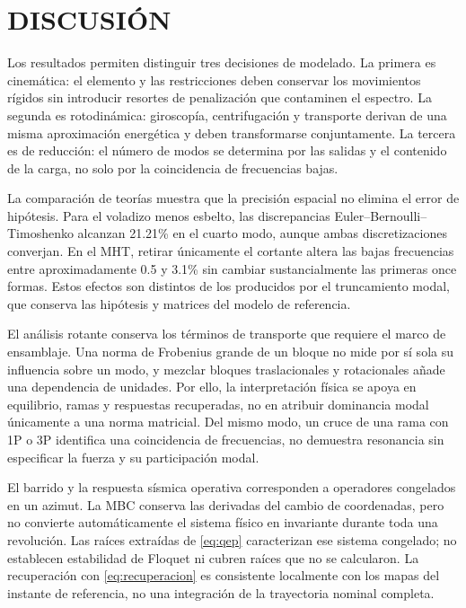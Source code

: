 \documentclass[oneside,a4paper,spanish,links,pagenumbers]{amca}
\begin{document}
\section{DISCUSIÓN}
\label{sec:discusion}
Los resultados permiten distinguir tres decisiones de modelado. La primera es cinemática: el elemento y las restricciones deben conservar los movimientos rígidos sin introducir resortes de penalización que contaminen el espectro. La segunda es rotodinámica: giroscopía, centrifugación y transporte derivan de una misma aproximación energética y deben transformarse conjuntamente. La tercera es de reducción: el número de modos se determina por las salidas y el contenido de la carga, no solo por la coincidencia de frecuencias bajas.

La comparación de teorías muestra que la precisión espacial no elimina el error de hipótesis. Para el voladizo menos esbelto, las discrepancias Euler--Bernoulli--Timoshenko alcanzan 21.21\% en el cuarto modo, aunque ambas discretizaciones converjan. En el MHT, retirar únicamente el cortante altera las bajas frecuencias entre aproximadamente 0.5 y 3.1\% sin cambiar sustancialmente las primeras once formas. Estos efectos son distintos de los producidos por el truncamiento modal, que conserva las hipótesis y matrices del modelo de referencia.

El análisis rotante conserva los términos de transporte que requiere el marco de ensamblaje. Una norma de Frobenius grande de un bloque no mide por sí sola su influencia sobre un modo, y mezclar bloques traslacionales y rotacionales añade una dependencia de unidades. Por ello, la interpretación física se apoya en equilibrio, ramas y respuestas recuperadas, no en atribuir dominancia modal únicamente a una norma matricial. Del mismo modo, un cruce de una rama con 1P o 3P identifica una coincidencia de frecuencias, no demuestra resonancia sin especificar la fuerza y su participación modal.

El barrido y la respuesta sísmica operativa corresponden a operadores congelados en un azimut. La MBC conserva las derivadas del cambio de coordenadas, pero no convierte automáticamente el sistema físico en invariante durante toda una revolución. Las raíces extraídas de \eqref{eq:qep} caracterizan ese sistema congelado; no establecen estabilidad de Floquet ni cubren raíces que no se calcularon. La recuperación con \eqref{eq:recuperacion} es consistente localmente con los mapas del instante de referencia, no una integración de la trayectoria nominal completa.
\end{document}
